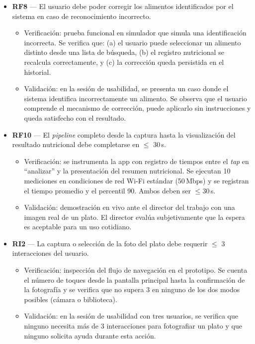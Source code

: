 \documentclass[
11pt, %
]{charter}
\begin{document}
\begin{itemize}
\item \textbf{RF8} --- El usuario debe poder corregir los alimentos identificados por el sistema en caso de reconocimiento incorrecto.
\begin{itemize}
	\item Verificación: prueba funcional en simulador que simula una identificación incorrecta. Se verifica que: (a) el usuario puede seleccionar un alimento distinto desde una lista de búsqueda, (b) el registro nutricional se recalcula correctamente, y (c) la corrección queda persistida en el historial.
	\item Validación: en la sesión de usabilidad, se presenta un caso donde el sistema identifica incorrectamente un alimento. Se observa que el usuario comprende el mecanismo de corrección, puede aplicarlo sin instrucciones y queda satisfecho con el resultado.
\end{itemize}

\item \textbf{RF10} --- El \textit{pipeline} completo desde la captura hasta la visualización del resultado nutricional debe completarse en $\leq$ 30\,s.
\begin{itemize}
	\item Verificación: se instrumenta la app con registro de tiempos entre el \textit{tap} en ``analizar'' y la presentación del resumen nutricional. Se ejecutan 10 mediciones en condiciones de red Wi-Fi estándar (50\,Mbps) y se registran el tiempo promedio y el percentil 90. Ambos deben ser $\leq$30\,s.
	\item Validación: demostración en vivo ante el director del trabajo con una imagen real de un plato. El director evalúa subjetivamente que la espera es aceptable para un uso cotidiano.
\end{itemize}

\item \textbf{RI2} --- La captura o selección de la foto del plato debe requerir $\leq$ 3 interacciones del usuario.
\begin{itemize}
	\item Verificación: inspección del flujo de navegación en el prototipo. Se cuenta el número de toques desde la pantalla principal hasta la confirmación de la fotografía y se verifica que no supera 3 en ninguno de los dos modos posibles (cámara o biblioteca).
	\item Validación: en la sesión de usabilidad con tres usuarios, se verifica que ninguno necesita más de 3 interacciones para fotografiar un plato y que ninguno solicita ayuda durante esta acción.
\end{itemize}


\end{itemize}
\end{document}

